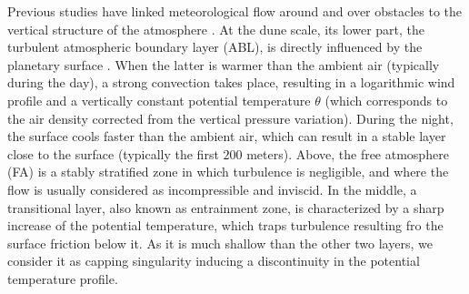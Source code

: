   Previous studies have linked meteorological flow around and over obstacles to the vertical structure of the atmosphere \citep{Stull1988}. At the dune scale, its lower part, the turbulent atmospheric boundary layer (ABL), is directly influenced by the planetary surface \citep{Stull1988}. When the latter is warmer than the ambient air (typically during the day), a strong convection takes place, resulting in a logarithmic wind profile and a vertically constant potential temperature $\theta$ (which corresponds to the air density corrected from the vertical pressure variation). During the night, the surface cools faster than the ambient air, which can result in a stable layer close to the surface (typically the first $200$ meters). Above, the free atmosphere (FA) is a stably stratified zone in which turbulence is negligible, and where the flow is usually considered as incompressible and inviscid. In the middle, a transitional layer, also known as entrainment zone, is characterized by a sharp increase of the potential temperature, which traps turbulence resulting fro the surface friction below it. As it is much shallow than the other two layers, we consider it as capping singularity inducing a discontinuity in the potential temperature profile.

